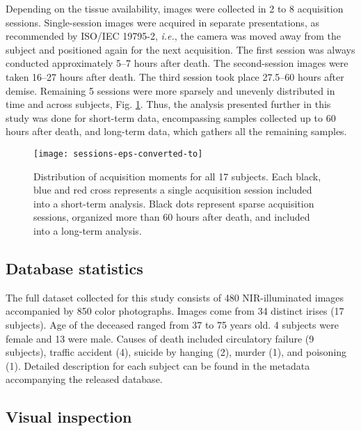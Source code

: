 \documentclass[10pt,twocolumn,letterpaper]{article}
\begin{document}
Depending on the tissue availability, images were collected in 2 to 8 acquisition sessions. Single-session images were acquired in separate presentations, as recommended by ISO/IEC 19795-2, \emph{i.e.}, the camera was moved away from the subject and positioned again for the next acquisition. The first session was always conducted approximately 5--7 hours after death. The second-session images were taken 16--27 hours after death. The third session took place 27.5--60 hours after demise. Remaining 5 sessions were more sparsely and unevenly distributed in time and across subjects, Fig. \ref{fig:sessions}. Thus, the analysis presented further in this study was done for short-term data, encompassing samples collected up to 60 hours after death, and long-term data, which gathers all the remaining samples.

\begin{figure}[!htb]
\centering
\texttt{[image: sessions-eps-converted-to]}
\caption{Distribution of acquisition moments for all 17 subjects. Each black, blue and red cross represents a single acquisition session included into a short-term analysis. Black dots represent sparse acquisition sessions, organized more than 60 hours after death, and included into a long-term analysis.}
\label{fig:sessions}
\end{figure}


\subsection{Database statistics}

The full dataset collected for this study consists of 480 NIR-illuminated images accompanied by 850 color photographs. Images come from 34 distinct irises (17 subjects). Age of the deceased ranged from 37 to 75 years old. 4 subjects were female and 13 were male. Causes of death included circulatory failure (9 subjects), traffic accident (4), suicide by hanging (2), murder (1), and poisoning (1). Detailed description for each subject can be found in the metadata accompanying the released database.

\subsection{Visual inspection}
\end{document}

